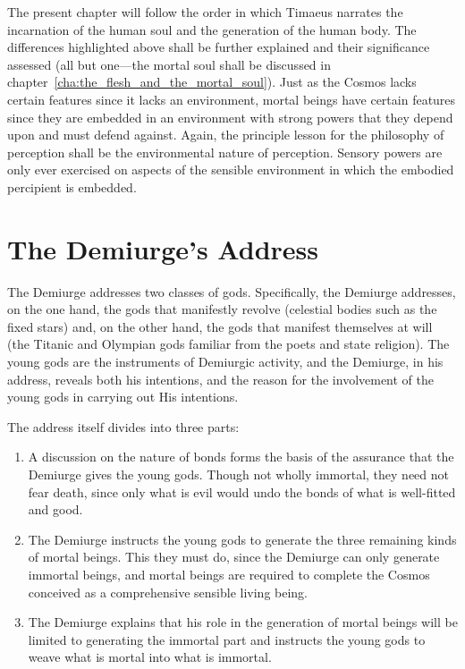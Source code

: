 The present chapter will follow the order in which Timaeus narrates the incarnation of the human soul and the generation of the human body. The differences highlighted above shall be further explained and their significance assessed (all but one---the mortal soul shall be discussed in chapter~\ref{cha:the_flesh_and_the_mortal_soul}). Just as the Cosmos lacks certain features since it lacks an environment, mortal beings have certain features since they are embedded in an environment with strong powers that they depend upon and must defend against. Again, the principle lesson for the philosophy of perception shall be the environmental nature of perception. Sensory powers are only ever exercised on aspects of the sensible environment in which the embodied percipient is embedded.


\section{The Demiurge's Address} %
\label{sec:the_demiurge_addressing_the_gods}

The Demiurge addresses two classes of gods. Specifically, the Demiurge addresses, on the one hand, the gods that manifestly revolve (celestial bodies such as the fixed stars) and, on the other hand, the gods that manifest themselves at will (the Titanic and Olympian gods familiar from the poets and state religion). The young gods are the instruments of Demiurgic activity, and the Demiurge, in his address, reveals both his intentions, and the reason for the involvement of the young gods in carrying out His intentions.

The address itself divides into three parts:
\begin{enumerate}[(1)]
	\item A discussion on the nature of bonds forms the basis of the assurance that the Demiurge gives the young gods. Though not wholly immortal, they need not fear death, since only what is evil would undo the bonds of what is well-fitted and good.
	\item The Demiurge instructs the young gods to generate the three remaining kinds of mortal beings. This they must do, since the Demiurge can only generate immortal beings, and mortal beings are required to complete the Cosmos conceived as a comprehensive sensible living being.
	\item The Demiurge explains that his role in the generation of mortal beings will be limited to generating the immortal part and instructs the young gods to weave what is mortal into what is immortal.
\end{enumerate}


